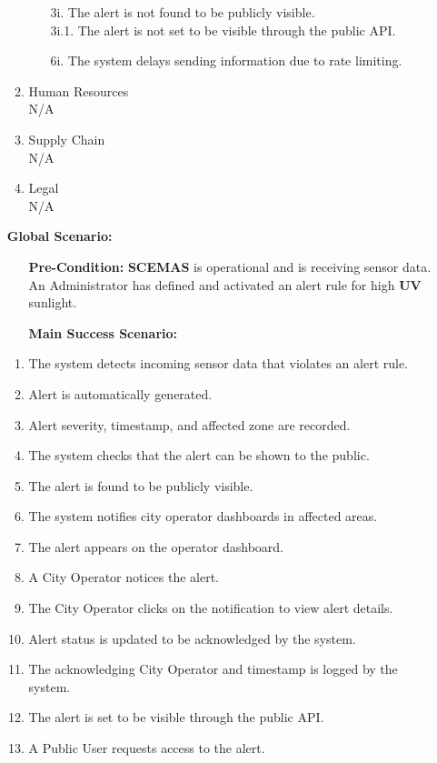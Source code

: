\documentclass[]{article}
\begin{document}
\begin{enumerate}[{\bf BE1.}]
\begin{enumerate}[{\bf VP1.}]
\begin{itemize}
				\item[3i.] The alert is not found to be publicly visible. \\
				\hspace{1cm}3i.1. The alert is not set to be visible through the public API.
				\item[6i.] The system delays sending information due to rate limiting.
			\end{itemize}
		\item Human Resources \\
			N/A
		\item Supply Chain \\
			N/A
		\item Legal \\
			N/A
		\end{enumerate}
		{\bf Global Scenario:}
		\begin{itemize}
			\item[] {\bf Pre-Condition:} \textbf{SCEMAS} is operational and is receiving sensor data. An Administrator has defined and activated an alert rule for high \textbf{UV} sunlight.
			\item[] {\bf Main Success Scenario:}
		\end{itemize}
		\begin{enumerate}[1.]
			\item The system detects incoming sensor data that violates an alert rule.
			\item Alert is automatically generated.
			\item Alert severity, timestamp, and affected zone are recorded.
			\item The system checks that the alert can be shown to the public.
			\item The alert is found to be publicly visible.
			\item The system notifies city operator dashboards in affected areas.
			\item The alert appears on the operator dashboard.
			\item A City Operator notices the alert.
			\item The City Operator clicks on the notification to view alert details.
			\item Alert status is updated to be acknowledged by the system.
			\item The acknowledging City Operator and timestamp is logged by the system.
			\item The alert is set to be visible through the public API.
			\item A Public User requests access to the alert.

\end{enumerate}
\end{enumerate}
\end{document}
